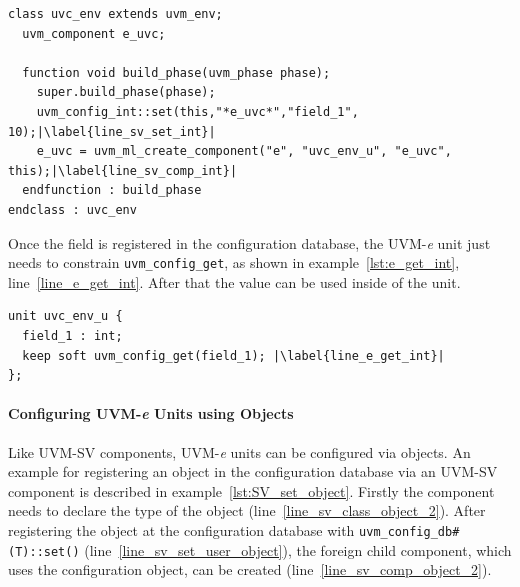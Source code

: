 \lstset{language=SystemVerilog, numbers = left, escapechar=|, breaklines=true}
\begin{lstlisting}[frame=htrbl, caption={SystemVerilog: register an integer in configuration database},
label={lst:SV_set_int}]
class uvc_env extends uvm_env;
  uvm_component e_uvc;
  
  function void build_phase(uvm_phase phase);
    super.build_phase(phase);
    uvm_config_int::set(this,"*e_uvc*","field_1", 10);|\label{line_sv_set_int}|
    e_uvc = uvm_ml_create_component("e", "uvc_env_u", "e_uvc", this);|\label{line_sv_comp_int}|
  endfunction : build_phase
endclass : uvc_env
\end{lstlisting}

Once the field is registered in the configuration database, the UVM-\textit{e} unit just needs to constrain
\lstinline$uvm_config_get$, as shown in example~\ref{lst:e_get_int}, line~\ref{line_e_get_int}. After that the value can
be used inside of the unit.

\lstset{language=e, numbers = left, escapechar=|, breaklines=true}
\begin{lstlisting}[frame=htrbl, caption={e: getting an integer from configuration database}, label={lst:e_get_int}]
unit uvc_env_u {
  field_1 : int;
  keep soft uvm_config_get(field_1); |\label{line_e_get_int}|
};
\end{lstlisting}
\paragraph{Configuring UVM-\textit{e} Units using Objects}
Like UVM-SV components, UVM-\textit{e} units can be configured via objects. An example for registering an
object in the configuration database via an UVM-SV component is described in
example~\ref{lst:SV_set_object}. Firstly the component needs to declare the type of the object
(line~\ref{line_sv_class_object_2}). After registering the object at the configuration database with
\lstinline$uvm_config_db#(T)::set()$ (line~\ref{line_sv_set_user_object}), the foreign child component, which uses the
configuration object, can be created (line~\ref{line_sv_comp_object_2}).

